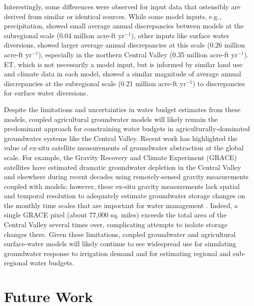 Interestingly, some differences were observed for input data that ostensibly are derived from similar or identical sources. While some model inputs, e.g., precipitation, showed small average annual discrepancies between models at the subregional scale (0.04 million acre-ft yr$^{-1}$), other inputs like surface water diversions, showed larger average annual discrepancies at this scale (0.26 million acre-ft yr$^{-1}$), especially in the northern Central Valley (0.35 million acre-ft yr$^{-1}$). ET, which is not necessarily a model input, but is informed by similar land use and climate data in each model, showed a similar magnitude of average annual discrepancies at the subregional scale (0.21 million acre-ft yr$^{-1}$) to discrepancies for surface water diversions.

Despite the limitations and uncertainties in water budget estimates from these models, coupled agricultural groundwater models will likely remain the predominant approach for constraining water budgets in agriculturally-dominated groundwater systems like the Central Valley. Recent work has highlighted the value of ex-situ satellite measurements of groundwater abstraction at the global scale. For example, the Gravity Recovery and Climate Experiment (GRACE) satellites have estimated dramatic groundwater depletion in the Central Valley \citep{famiglietti2011satellites} and elsewhere \citep[e.g.,][]{rodell2009satellite,scanlon2012groundwater,scanlon2015hydrologic} during recent decades using remotely-sensed gravity measurements coupled with models; however, these ex-situ gravity measurements lack spatial and temporal resolution to adequately estimate groundwater storage changes on the monthly time scales that are important for water management \citep{alley2015bringing}. Indeed, a single GRACE pixel (about 77,000 sq. miles) \citep{famiglietti2011satellites} exceeds the total area of the Central Valley several times over, complicating attempts to isolate storage changes there. Given these limitations, coupled groundwater and agricultural surface-water models will likely continue to see widespread use for simulating groundwater response to irrigation demand and for estimating regional and sub-regional water budgets. 

\section{Future Work}

